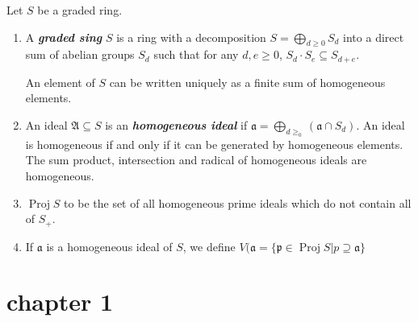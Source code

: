 \documentclass{article}
\begin{document}
\begin{defn}[Proj]Let $S$ be a graded ring.
	\begin{enumerate}
		\item A \textit{\textbf{graded sing}} $S$ is a ring with a decomposition  $S=\bigoplus_{d\geq 0}S_d  $ into a direct sum of abelian groups $S_d$ such that for any $d,e\geq 0$, $S_d\cdot S_e\subseteq S_{d+e}$.
		
			An element of $S$  can be written uniquely as a finite sum of homogeneous elements.
		\item An ideal $\mathfrak{A}\subseteq S$  is an \textit{\textbf{homogeneous ideal}} if $\mathfrak{a}=\bigoplus_{d\geq_0}(\mathfrak{a}\cap S_d)  $. An ideal is homogeneous if and only if it can be generated by homogeneous elements. The sum product, intersection and radical of homogeneous ideals are homogeneous.
		\item $\operatorname{Proj}S$ to be the set of all homogeneous prime ideals which do not contain all of $S_+$.
		\item If $\mathfrak{a}$ is a homogeneous ideal of $S$, we define $V(\mathfrak{a}=\{\mathfrak{p}\in \operatorname{Proj}S|p\supseteq\mathfrak{a}\} $

	\end{enumerate}
	
\end{defn}



\section{chapter 1}
\end{document}
